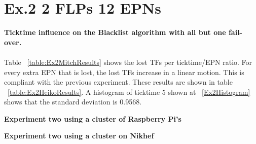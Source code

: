 \section{Ex.2 2 FLPs 12 EPNs}
\textbf{Ticktime influence on the Blacklist algorithm with all but one fail-over.}
\\~\\
Table ~\ref{table:Ex2MitchResults} shows the lost TFs per ticktime/EPN ratio. For every extra EPN that is lost, the lost TFs increase in a linear motion. This is compliant with the previous experiment. These results are shown in table ~\ref{table:Ex2HeikoResults}. A histogram of ticktime 5 shown at ~\ref{Ex2Histogram} shows that the standard deviation is 0.9568.

\begin{table}[h!]
\caption*{\textbf{Experiment two using a cluster of Raspberry Pi's}}
\caption{Cumulative lost TFs by ticktime/EPN ratio with a flat sample size for the Blacklist algorithm}
\label{table:Ex2MitchResults}
\end{table}

\begin{table}[h!]
\caption*{\textbf{Experiment two using a cluster on Nikhef}}
\caption{Cumulative lost TFs by ticktime by lost EPNs (van der Heijden, 2018, p. 38)}
\label{table:Ex2HeikoResults}
\end{table}

